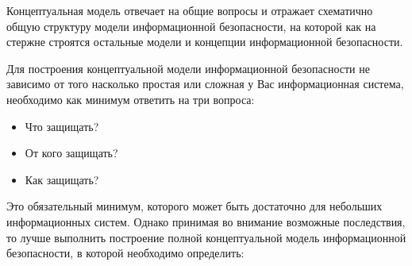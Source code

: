 
Концептуальная модель отвечает на общие вопросы и отражает схематично общую структуру модели информационной безопасности, на которой как на стержне строятся остальные модели и концепции информационной безопасности.

Для построения концептуальной модели информационной безопасности не зависимо от того насколько простая или сложная у Вас информационная система, необходимо как минимум ответить на три вопроса:
\begin{itemize}
  \item Что защищать?
  \item От кого защищать?
  \item Как защищать?
\end{itemize}
Это обязательный минимум, которого может быть достаточно для небольших информационных систем. Однако принимая во внимание возможные последствия, то лучше выполнить построение полной концептуальной модель информационной безопасности, в которой необходимо определить:
\\

